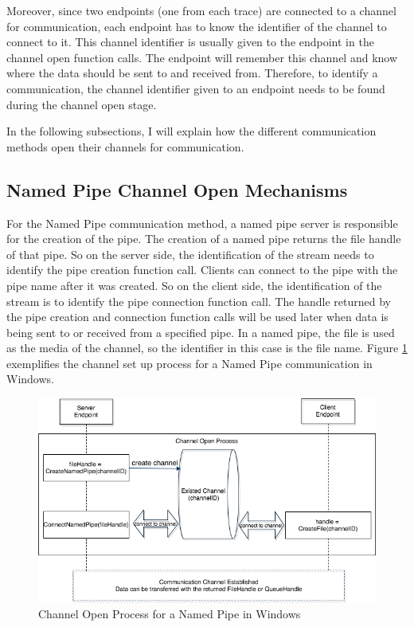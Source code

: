 Moreover, since two endpoints (one from each trace) are connected to a channel for communication, each endpoint has to know the identifier of the channel to connect to it. This channel identifier is usually given to the endpoint in the channel open function calls. The endpoint will remember this channel and know where the data should be sent to and received from. Therefore, to identify a communication, the channel identifier given to an endpoint needs to be found during the channel open stage.

In the following subsections, I will explain how the different communication methods open their channels for communication.

\subsection{Named Pipe Channel Open Mechanisms} 
For the Named Pipe communication method, a named pipe server is responsible for the creation of the pipe. The creation of a named pipe returns the file handle of that pipe. So on the server side, the identification of the stream needs to identify the pipe creation function call. Clients can connect to the pipe with the pipe name after it was created. So on the client side, the identification of the stream is to identify the pipe connection function call. The handle returned by the pipe creation and connection function calls will be used later when data is being sent to or received from a specified pipe. In a named pipe, the file is used as the media of the channel, so the identifier in this case is the file name. \cite{WinNamedpipe} Figure \ref{namedpipeopen} exemplifies the channel set up process for a Named Pipe communication in Windows. 

\begin{figure}[H]
\centerline{\includegraphics[scale=0.5]{Figures/namepipechannelopen}}
 \caption{Channel Open Process for a Named Pipe in Windows}
\label{namedpipeopen}
\end{figure}
    
